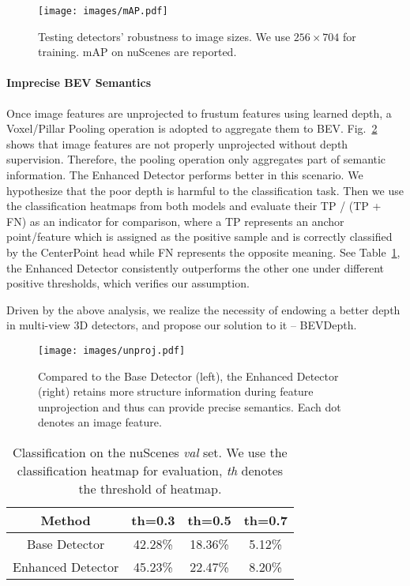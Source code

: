 \documentclass[twocolumn,letterpaper]{article}
\begin{document}
\begin{figure}[!t]
\texttt{[image: images/mAP.pdf]}
\caption{Testing detectors' robustness to image sizes. We use $256\times704$ for training. mAP on nuScenes are reported.}
\vspace{-.1in}
\label{sizes}
\end{figure}

\paragraph{Imprecise BEV Semantics} Once image features are unprojected to frustum features using learned depth, a Voxel/Pillar Pooling operation is adopted to aggregate them to BEV. Fig.~\ref{unproj} shows that image features are not properly unprojected without depth supervision. Therefore, the pooling operation only aggregates part of semantic information. The Enhanced Detector performs better in this scenario. We hypothesize that the poor depth is harmful to the classification task. Then we use the classification heatmaps from both models and evaluate their TP / (TP + FN) as an indicator for comparison, where a TP represents an anchor point/feature which is assigned as the positive sample and is correctly classified by the CenterPoint head while FN represents the opposite meaning. See Table~\ref{tab:cls-acc}, the Enhanced Detector consistently outperforms the other one under different positive thresholds, which verifies our assumption.


Driven by the above analysis, we realize the necessity of endowing a better depth in multi-view 3D detectors, and propose our solution to it -- BEVDepth.

\begin{figure}[!t]
\texttt{[image: images/unproj.pdf]}
\caption{Compared to the Base Detector (left), the Enhanced Detector (right) retains more structure information during feature unprojection and thus can provide precise semantics. Each dot denotes an image feature.}
\label{unproj}
\end{figure}

\begin{table}
\centering
\begin{tabular}{c|ccc} 
\toprule
\textbf{Method} &\textbf{th=0.3}   & \textbf{th=0.5} & \textbf{th=0.7} \\
\midrule
 Base Detector & 42.28\% & 18.36\% & 5.12\%     \\
 Enhanced Detector & 45.23\% & 22.47\% & 8.20\%    \\
\bottomrule
\end{tabular}
\caption{Classification on the nuScenes \emph{val} set. We use the classification heatmap for evaluation, \emph{th} denotes the threshold of heatmap.}
\label{tab:cls-acc}
\end{table}
\end{document}
